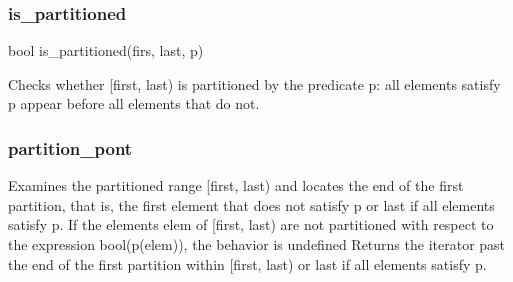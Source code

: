 \documentclass{report}
\begin{document}
 \bigbreak \noindent 
 \subsubsection{is\_partitioned}
 \bigbreak \noindent 
 \begin{cppcode}
 bool is_partitioned(firs, last, p)
 \end{cppcode}
 \bigbreak \noindent 
 Checks whether [first, last) is partitioned by the predicate p: all elements satisfy p appear before all elements that do not.

 \bigbreak \noindent 
 \subsubsection{partition\_pont}
 \bigbreak \noindent 
 Examines the partitioned range [first, last) and locates the end of the first partition, that is, the first element that does not satisfy p or last if all elements satisfy p.
 \bigbreak \noindent 
If the elements elem of [first, last) are not partitioned with respect to the expression bool(p(elem)), the behavior is undefined
\bigbreak \noindent 
Returns the iterator past the end of the first partition within [first, last) or last if all elements satisfy p.
\end{document}
